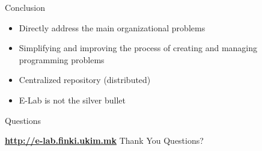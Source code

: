 \begin{frame}{Conclusion}
	\begin{itemize}[<+-| alert@+>]
	  \item Directly address the main organizational problems
	  \item Simplifying and improving the process of creating and managing
	  programming problems
	  \item Centralized repository (distributed)
	  \item E-Lab is not the silver bullet
	\end{itemize}
\end{frame}

\begin{frame}{Questions}{}
	\begin{center}
	\Large{
    \href{http://e-lab.finki.ukim.mk/}{\textbf{http://e-lab.finki.ukim.mk}}}
    \vfill
    \huge{Thank You}
    \vfill    
    \Huge{Questions?}
	
	\end{center}
\end{frame}

